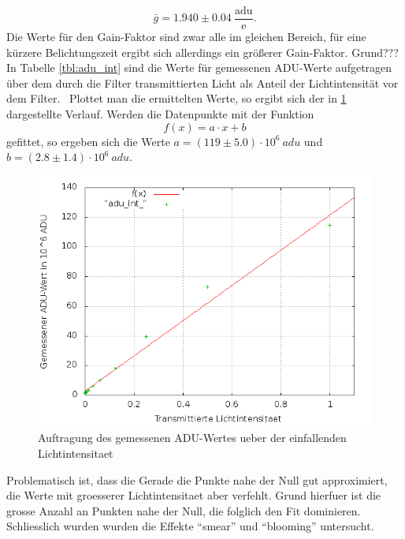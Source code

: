 \begin{equation}
\bar{g} = 1.940 \pm 0.04 \ \frac{\mathrm{adu}}{\mathrm{e}}. 
\end{equation}
Die Werte für den Gain-Faktor sind zwar alle im gleichen Bereich, für eine kürzere Belichtungszeit ergibt sich allerdings ein größerer Gain-Faktor. Grund???\\
In Tabelle \ref{tbl:adu_int} sind die Werte für gemessenen ADU-Werte aufgetragen über dem durch die Filter transmittierten Licht als Anteil der Lichtintensität vor dem Filter. \
Plottet man die ermittelten Werte, so ergibt sich der in \ref{plot:adu_int} dargestellte Verlauf. Werden die Datenpunkte mit der Funktion 
\begin{equation}
f(x) = a \cdot x + b
\end{equation}
gefittet, so ergeben sich die Werte $a = (119 \pm 5.0) \cdot 10^6 \ adu$ und $b = (2.8 \pm 1.4) \cdot 10^6 \ adu$.
\begin{figure}[h!]
        \includegraphics[width=.9\textwidth]{adu_int_.png}
\caption{ Auftragung des gemessenen ADU-Wertes ueber der einfallenden Lichtintensitaet }
\label{plot:adu_int}
\end{figure}
Problematisch ist, dass die Gerade die Punkte nahe der Null gut approximiert, die Werte mit groesserer Lichtintensitaet aber verfehlt. Grund hierfuer ist die grosse Anzahl an Punkten nahe der Null, die folglich den Fit dominieren. \\
Schliesslich wurden wurden die Effekte \enquote{smear} und \enquote{blooming} untersucht. 


